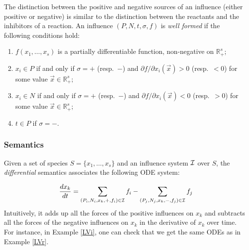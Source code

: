\documentclass[graybox]{svmult}
\newcommand\for{\mathbin{\text{for}}}
\begin{document}
The distinction between the positive and negative sources of an influence (either positive or negative)
is similar to the distinction between the reactants and the inhibitors of a reaction.
An influence $(P, N, t, \sigma, f)$ is \emph{well formed} if the following conditions hold:
\begin{enumerate}
\item $f(x_1,\dots,x_s)$ is a partially differentiable function, non-negative
   on $\mathbb{R}_+^s$;
\item $x_i\in P$ if and only if $\sigma = +$ (resp.\ $-$) and
   ${\partial {f}}/ {\partial x_i}(\vec x)>0$ (resp.\ $<0$) for some value
   $\vec x\in\mathbb{R}_+^s$;
\item $x_i\in N$ if and only if $\sigma = +$ (resp.\ $-$) and
   ${\partial {f}}/ {\partial x_i}(\vec x)<0$ (resp.\ $>0$) for some value
  $\vec x\in\mathbb{R}_+^s$;
  \item $t\in P$ if $\sigma=-$.
\end{enumerate}




\subsubsection{Semantics}\label{semI}

Given a set of species $S=\{x_1,\dots,x_s\}$ and an influence system $\cal I$ over $S$, 
the \emph{differential} semantics associates the following ODE system:

\[
   \frac{dx_k}{dt} = \sum_{(P_i, N_i, x_k, +, f_i) \in \cal I}f_i - \sum_{(P_j, N_j, x_k, -, f_j) \in \cal I}f_j
\]
Intuitively, it adds up all the forces of the positive influences on $x_k$ and
subtracts all the forces of the negative influences on $x_k$ in the derivative of
$x_k$ over time.
For instance, in Example \ref{LVi}, one can check that we get the same ODEs as in Example \ref{LVr}. 
\end{document}
